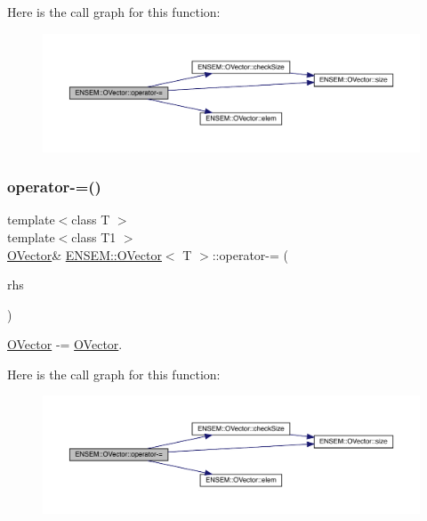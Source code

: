 Here is the call graph for this function\+:
\nopagebreak
\begin{figure}[H]
\begin{center}
\leavevmode
\includegraphics[width=350pt]{d0/d8d/classENSEM_1_1OVector_ae8a6c2f30368c6713325d05065aec425_cgraph}
\end{center}
\end{figure}
\mbox{\label{classENSEM_1_1OVector_ae8a6c2f30368c6713325d05065aec425}} 
\subsubsection{\texorpdfstring{operator-\/=()}{operator-=()}\hspace{0.1cm}{\footnotesize\ttfamily [5/6]}}
{\footnotesize\ttfamily template$<$class T $>$ \\
template$<$class T1 $>$ \\
\mbox{\hyperlink{classENSEM_1_1OVector}{O\+Vector}}\& \mbox{\hyperlink{classENSEM_1_1OVector}{E\+N\+S\+E\+M\+::\+O\+Vector}}$<$ T $>$\+::operator-\/= (\begin{DoxyParamCaption}\item[{const \mbox{\hyperlink{classENSEM_1_1OVector}{O\+Vector}}$<$ T1 $>$ \&}]{rhs }\end{DoxyParamCaption})\hspace{0.3cm}{\ttfamily [inline]}}



\mbox{\hyperlink{classENSEM_1_1OVector}{O\+Vector}} -\/= \mbox{\hyperlink{classENSEM_1_1OVector}{O\+Vector}}. 

Here is the call graph for this function\+:
\nopagebreak
\begin{figure}[H]
\begin{center}
\leavevmode
\includegraphics[width=350pt]{d0/d8d/classENSEM_1_1OVector_ae8a6c2f30368c6713325d05065aec425_cgraph}
\end{center}
\end{figure}
\mbox{\label{classENSEM_1_1OVector_ae8a6c2f30368c6713325d05065aec425}} 
